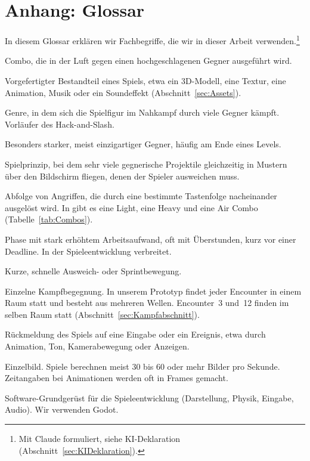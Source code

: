 \documentclass[../Main.tex]{subfiles}
\begin{document}
\newpage
\section{Anhang: Glossar} \label{sec:Glossar}

In diesem Glossar erklären wir Fachbegriffe, die wir in dieser Arbeit verwenden.\footnote{Mit Claude formuliert, siehe KI-Deklaration (Abschnitt~\ref{sec:KIDeklaration}).}

\begin{description}[style=unboxed, leftmargin=0cm, itemsep=0.3em]
\item[Air Combo] Combo, die in der Luft gegen einen hochgeschlagenen Gegner ausgeführt wird.
\item[Asset] Vorgefertigter Bestandteil eines Spiels, etwa ein 3D-Modell, eine Textur, eine Animation, Musik oder ein Soundeffekt (Abschnitt~\ref{sec:Assets}).
\item[Beat 'em up] Genre, in dem sich die Spielfigur im Nahkampf durch viele Gegner kämpft. Vorläufer des Hack-and-Slash.
\item[Bossgegner] Besonders starker, meist einzigartiger Gegner, häufig am Ende eines Levels.
\item[Bullet-Hell] Spielprinzip, bei dem sehr viele gegnerische Projektile gleichzeitig in Mustern über den Bildschirm fliegen, denen der Spieler ausweichen muss.
\item[Combo] Abfolge von Angriffen, die durch eine bestimmte Tastenfolge nacheinander ausgelöst wird. In  gibt es eine Light, eine Heavy und eine Air Combo (Tabelle~\ref{tab:Combos}).
\item[Crunch] Phase mit stark erhöhtem Arbeitsaufwand, oft mit Überstunden, kurz vor einer Deadline. In der Spieleentwicklung verbreitet.
\item[Dash] Kurze, schnelle Ausweich- oder Sprintbewegung.
\item[Encounter] Einzelne Kampfbegegnung. In unserem Prototyp findet jeder Encounter in einem Raum statt und besteht aus mehreren Wellen. Encounter~3 und~12 finden im selben Raum statt (Abschnitt~\ref{sec:Kampfabschnitt}).
\item[Feedback] Rückmeldung des Spiels auf eine Eingabe oder ein Ereignis, etwa durch Animation, Ton, Kamerabewegung oder Anzeigen.
\item[Frame] Einzelbild. Spiele berechnen meist 30 bis 60 oder mehr Bilder pro Sekunde. Zeitangaben bei Animationen werden oft in Frames gemacht.
\item[Game Engine] Software-Grundgerüst für die Spieleentwicklung (Darstellung, Physik, Eingabe, Audio). Wir verwenden Godot.

\end{description}
\end{document}
